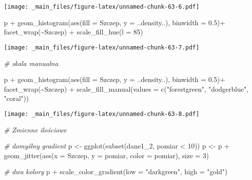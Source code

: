 \documentclass[
]{book}
\newenvironment{Shaded}{\begin{snugshade}}{\end{snugshade}}
\newcommand{\AttributeTok}[1]{\textcolor[rgb]{0.77,0.63,0.00}{#1}}
\newcommand{\CommentTok}[1]{\textcolor[rgb]{0.56,0.35,0.01}{\textit{#1}}}
\newcommand{\DecValTok}[1]{\textcolor[rgb]{0.00,0.00,0.81}{#1}}
\newcommand{\FloatTok}[1]{\textcolor[rgb]{0.00,0.00,0.81}{#1}}
\newcommand{\FunctionTok}[1]{\textcolor[rgb]{0.00,0.00,0.00}{#1}}
\newcommand{\NormalTok}[1]{#1}
\newcommand{\OtherTok}[1]{\textcolor[rgb]{0.56,0.35,0.01}{#1}}
\newcommand{\SpecialCharTok}[1]{\textcolor[rgb]{0.00,0.00,0.00}{#1}}
\newcommand{\StringTok}[1]{\textcolor[rgb]{0.31,0.60,0.02}{#1}}
\begin{document}
\texttt{[image: \_main\_files/figure-latex/unnamed-chunk-63-6.pdf]}

\begin{Shaded}
\begin{Highlighting}[]
\NormalTok{p }\SpecialCharTok{+} \FunctionTok{geom\_histogram}\NormalTok{(}\FunctionTok{aes}\NormalTok{(}\AttributeTok{fill =}\NormalTok{ Szczep, }\AttributeTok{y =}\NormalTok{ ..density..), }\AttributeTok{binwidth =} \FloatTok{0.5}\NormalTok{)}\SpecialCharTok{+}
  \FunctionTok{facet\_wrap}\NormalTok{(}\SpecialCharTok{\textasciitilde{}}\NormalTok{Szczep) }\SpecialCharTok{+} \FunctionTok{scale\_fill\_hue}\NormalTok{(}\AttributeTok{l =} \DecValTok{85}\NormalTok{)}
\end{Highlighting}
\end{Shaded}

\texttt{[image: \_main\_files/figure-latex/unnamed-chunk-63-7.pdf]}

\begin{Shaded}
\begin{Highlighting}[]
\CommentTok{\# skala manualna}

\NormalTok{p }\SpecialCharTok{+} \FunctionTok{geom\_histogram}\NormalTok{(}\FunctionTok{aes}\NormalTok{(}\AttributeTok{fill =}\NormalTok{ Szczep, }\AttributeTok{y =}\NormalTok{ ..density..), }\AttributeTok{binwidth =} \FloatTok{0.5}\NormalTok{)}\SpecialCharTok{+}
  \FunctionTok{facet\_wrap}\NormalTok{(}\SpecialCharTok{\textasciitilde{}}\NormalTok{Szczep) }\SpecialCharTok{+} \FunctionTok{scale\_fill\_manual}\NormalTok{(}\AttributeTok{values =} \FunctionTok{c}\NormalTok{(}\StringTok{"forestgreen"}\NormalTok{, }\StringTok{"dodgerblue"}\NormalTok{, }\StringTok{"coral"}\NormalTok{))}
\end{Highlighting}
\end{Shaded}

\texttt{[image: \_main\_files/figure-latex/unnamed-chunk-63-8.pdf]}

\begin{Shaded}
\begin{Highlighting}[]
\CommentTok{\# Zmienne ilościowe}

\CommentTok{\# domyślny gradient}
\NormalTok{p }\OtherTok{\textless{}{-}} \FunctionTok{ggplot}\NormalTok{(}\FunctionTok{subset}\NormalTok{(dane1\_2, pomiar }\SpecialCharTok{\textless{}} \DecValTok{10}\NormalTok{))}
\NormalTok{p  }\OtherTok{\textless{}{-}}\NormalTok{ p }\SpecialCharTok{+} \FunctionTok{geom\_jitter}\NormalTok{(}\FunctionTok{aes}\NormalTok{(}\AttributeTok{x =}\NormalTok{ Szczep, }\AttributeTok{y =}\NormalTok{ pomiar, }\AttributeTok{color =}\NormalTok{ pomiar), }\AttributeTok{size =} \DecValTok{3}\NormalTok{)}

\CommentTok{\# dwa kolory}
\NormalTok{p }\SpecialCharTok{+} \FunctionTok{scale\_color\_gradient}\NormalTok{(}\AttributeTok{low =} \StringTok{"darkgreen"}\NormalTok{, }\AttributeTok{high =} \StringTok{"gold"}\NormalTok{)}
\end{Highlighting}
\end{Shaded}
\end{document}
